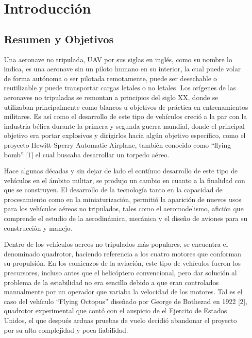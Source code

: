 \documentclass[../main.tex]{subfiles}
\begin{document}
		
	\chapter[Introducción]{Introducción}
	\section[Resumen]{Resumen y Objetivos}	

Una aeronave no tripulada, UAV por sus siglas en inglés, como su nombre lo indica,
es una aeronave sin un piloto humano en su interior,
la cual puede volar de forma autónoma o ser pilotada remotamente,
puede ser desechable o reutilizable y puede transportar cargas letales
o no letales. Los orígenes de las aeronaves no tripuladas se remontan
a principios del siglo XX, donde se utilizaban principalmente como
blancos u objetivos de práctica en entrenamientos militares. Es así
como el desarrollo de este tipo de vehículos creció a la par con la
industria bélica durante la primera y segunda guerra mundial, donde
el principal objetivo era portar explosivos y dirigirlos hacia algún
objetivo específico, como el proyecto Hewitt-Sperry Automatic Airplane,
también conocido como ``flying bomb'' {[}1{]} el cual buscaba desarrollar
un torpedo aéreo.

\textcompwordmark{}

Hace algunas décadas y sin dejar de lado el contínuo desarrollo de
este tipo de vehículos en el ámbito militar, se produjo un cambio
en cuanto a la finalidad con que se construyen. El desarrollo de la
tecnología tanto en la capacidad de procesamiento como en la miniaturización,
permitió la aparición de nuevos usos para los vehículos aéreos no
tripulados, tales como el aeromodelismo, afición que comprende el
estudio de la aerodinámica, mecánica y el diseño de aviones para su construcción
y manejo. 

\textcompwordmark{}

Dentro de los vehículos aereos no tripulados más populares, se encuentra
el denominado quadrotor, haciendo referencia a los cuatro motores
que conforman su propulsión. En los comienzos de la aviación, este
tipo de vehículos fueron los precursores, incluso antes que el helicóptero
convencional, pero dar solución al problema de la estabilidad no era
sencillo debido a que eran controlados manualmente por un operador
que variaba la velocidad de los motores. Tal es el caso del vehículo
``Flying Octopus'' diseñado por George de Bothezad en 1922 {[}2{]},
quadrotor experimental que contó con el auspicio de el Ejercito de
Estados Unidos, el que después arduas pruebas de vuelo decidió abandonar
el proyecto por su alta complejidad y poca fiabilidad.
\end{document}
